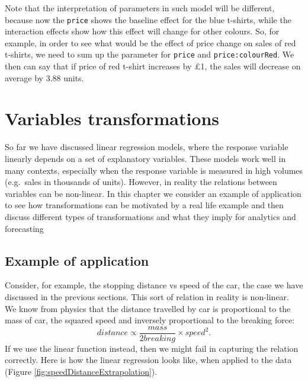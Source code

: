 \documentclass[
]{book}
\theoremstyle{definition}
\theoremstyle{definition}
\theoremstyle{definition}
\theoremstyle{definition}
\theoremstyle{remark}
\begin{document}
Note that the interpretation of parameters in such model will be different, because now the \texttt{price} shows the baseline effect for the blue t-shirts, while the interaction effects show how this effect will change for other colours. So, for example, in order to see what would be the effect of price change on sales of red t-shirts, we need to sum up the parameter for \texttt{price} and \texttt{price:colourRed}. We then can say that if price of red t-shirt increases by £1, the sales will decrease on average by 3.88 units.

\chapter{Variables transformations}\label{variablesTransformations}

So far we have discussed linear regression models, where the response variable linearly depends on a set of explanatory variables. These models work well in many contexts, especially when the response variable is measured in high volumes (e.g.~sales in thousands of units). However, in reality the relations between variables can be non-linear. In this chapter we consider an example of application to see how transformations can be motivated by a real life example and then discuss different types of transformations and what they imply for analytics and forecasting

\section{Example of application}\label{example-of-application}

Consider, for example, the stopping distance vs speed of the car, the case we have discussed in the previous sections. This sort of relation in reality is non-linear. We know from physics that the distance travelled by car is proportional to the mass of car, the squared speed and inversely proportional to the breaking force:
\begin{equation}
    distance \propto \frac{mass}{2 breaking} \times speed^2.
    \label{eq:speedDistanceFormula}
\end{equation}
If we use the linear function instead, then we might fail in capturing the relation correctly. Here is how the linear regression looks like, when applied to the data (Figure \ref{fig:speedDistanceExtrapolation}).
\end{document}
